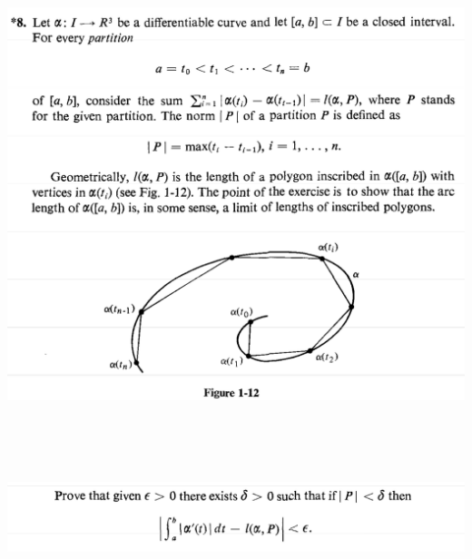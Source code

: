 \documentclass{report}
\begin{document}
\begin{question}{}{}
\includegraphics[height=15cm,width=18cm]{qu8}
\includegraphics[height=3cm,width=18cm]{qu7}
\end{question}
\end{document}
